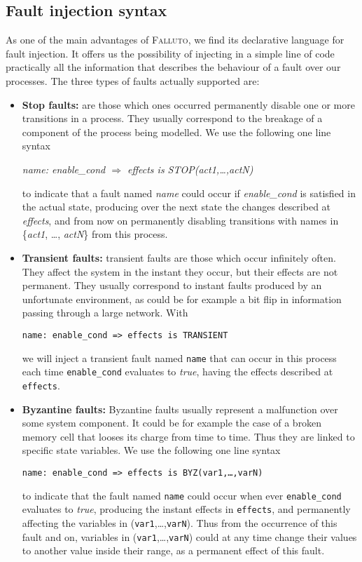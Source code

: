 \documentclass[12pt]{llncs2e/llncs}
\newcommand{\falluto}{\mbox{\textsc{Falluto}}}
\begin{document}
\subsection{Fault injection syntax}
As one of the main advantages of \falluto, we find its declarative language for fault injection. It offers us the possibility of injecting in a simple line of code practically all the information that describes the behaviour of a fault over our processes. The three types of faults actually supported are:
\begin{itemize}

\item \textbf{Stop faults:} are those which ones occurred permanently disable one or more transitions in a process. They usually correspond to the breakage of a component of the process being modelled. We use the following one line syntax
\begin{center}
\textit{name: enable\_cond $\Rightarrow$ effects is STOP(act1,\ldots,actN)}
\end{center}
to indicate that a fault named \textit{name} could occur if \textit{enable\_cond} is satisfied in the actual state, producing over the next state the changes described at \textit{effects}, and from now on permanently disabling transitions with names in \{\textit{act1}, \ldots, \textit{actN}\} from this process.

\item \textbf{Transient faults:} transient faults are those which occur infinitely often. They affect the system in the instant they occur, but their effects are not permanent. They usually correspond to instant faults produced by an unfortunate environment, as could be for example a bit flip in information passing through a large network. With
\begin{center}
\texttt{name: enable\_cond => effects is TRANSIENT}
\end{center}
we will inject a transient fault named \texttt{name} that can occur in this process each time \texttt{enable\_cond} evaluates to \textit{true}, having the effects described at \texttt{effects}.

\item \textbf{Byzantine faults:} Byzantine faults usually represent a malfunction over some system component. It could be for example the case of a broken memory cell that looses its charge from time to time. Thus they are linked to specific state variables. We use the following one line syntax
\begin{center}
\texttt{name: enable\_cond => effects is BYZ(var1,\ldots,varN)}
\end{center}
to indicate that the fault named \texttt{name} could occur when ever \texttt{enable\_cond} evaluates to \textit{true}, producing the instant effects in \texttt{effects}, and permanently affecting the variables in (\texttt{var1},\ldots,\texttt{varN}). Thus from the occurrence of this fault and on, variables in (\texttt{var1},\ldots,\texttt{varN}) could at any time change their values to another value inside their range, as a permanent effect of this fault.
\end{itemize}
\end{document}
